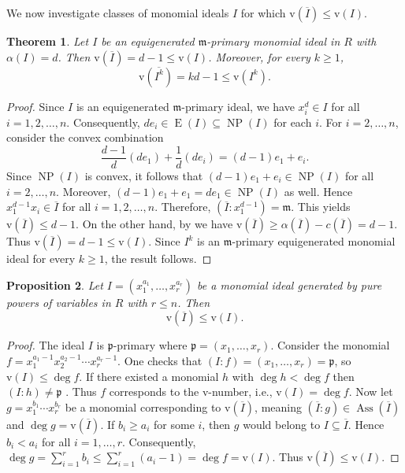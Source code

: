 \documentclass[11pt,reqno,a4paper]{amsart}
\newtheorem{theorem}{Theorem}[section]
\newtheorem{proposition}[theorem]{Proposition}
\theoremstyle{definition}
\begin{document}
\noindent We now investigate classes of monomial ideals \(I\) for which
\(
\mathrm{v}(\overline{I})\leq \mathrm{v}(I).
\)


\begin{theorem}\label{equigeneratedmprimary}
Let $I$ be an equigenerated $\mathfrak  {m}$-primary monomial ideal in \(R\) with $\alpha(I) = d$. Then $\mathrm{v}(\overline{I}) = d - 1 \leq \mathrm{v}({I})$. Moreover, for every \(k \ge 1\),
\[
\mathrm{v}(\overline{I^k}) = kd - 1 \le \mathrm{v}(I^k).
\]
\end{theorem}

\begin{proof}
Since $I$ is an equigenerated $\mathfrak{m}$-primary ideal, we have $x_i^d \in I$ for all $i = 1, 2, \ldots, n$. Consequently, $d e_i \in \operatorname{E}(I) \subseteq \operatorname{NP}(I)$ for each $i$. 
For $i = 2, \ldots, n$, consider the convex combination
\[
\frac{d-1}{d}(d e_1) + \frac{1}{d}(d e_i) = (d-1)e_1 + e_i.
\]
Since $\operatorname{NP}(I)$ is convex, it follows that $(d-1)e_1 + e_i \in \operatorname{NP}(I)$ for all $i = 2, \ldots, n$. Moreover, $(d-1)e_1 + e_1 = d e_1 \in \operatorname{NP}(I)$ as well. Hence $x_1^{d-1} x_i \in \overline{I}$ for all $i = 1, 2, \ldots, n$.
Therefore, $(\overline{I} : x_1^{d-1}) = \mathfrak{m}$. This yields $\mathrm{v}(\overline{I}) \le d - 1$. On the other hand, by \cite[Lemma 3.1]{BiswasMandalSaha26} we have $\mathrm{v}(\overline{I}) \ge \alpha(\overline{I}) - c(\overline{I}) = d - 1$. Thus $\mathrm{v}(\overline{I}) = d - 1 \leq \mathrm{v}({I})$. Since \(I^k\) is an \(\mathfrak{m}\)-primary equigenerated monomial ideal for every \(k \ge 1\), the result follows.
\end{proof}


\begin{proposition}
Let \(I = (x_1^{a_1}, \dots, x_r^{a_r})\) be a monomial ideal generated by pure powers of variables in \(R \) with \(r \le n\). Then 
\[
\mathrm{v}(\overline{I}) \le \mathrm{v}(I).
\]
\end{proposition}

\begin{proof}
The ideal \(I\) is \(\mathfrak{p}\)-primary where \(\mathfrak{p} = (x_1, \dots, x_r)\). Consider the monomial 
\(f = x_1^{a_1 - 1} x_2^{a_2 - 1} \cdots x_r^{a_r - 1}\). 
One checks that \((I : f) = (x_1, \dots, x_r) = \mathfrak{p}\), so \(\mathrm{v}(I) \le \deg f\). 
If there existed a monomial \(h\) with \(\deg h < \deg f\) then \((I : h) \neq \mathfrak{p}\) . Thus \(f\) corresponds to the \(\mathrm{v}\)-number, i.e., \(\mathrm{v}(I) = \deg f\). Now let \(g = x_1^{b_1} \cdots x_r^{b_r}\) be a monomial corresponding to \(\mathrm{v}(\overline{I})\), meaning \((\overline{I} : g) \in \operatorname{Ass}(\overline{I})\) and \(\deg g = \mathrm{v}(\overline{I})\). 
If \(b_i \ge a_i\) for some \(i\), then \(g\) would belong to \(I \subseteq \overline{I}\). Hence \(b_i < a_i\) for all \(i = 1, \dots, r\). Consequently,
\(
\deg g = \sum_{i=1}^r b_i \le \sum_{i=1}^r (a_i - 1) = \deg f = \mathrm{v}(I).
\)
Thus \(\mathrm{v}(\overline{I}) \le \mathrm{v}(I)\).
\end{proof}
\end{document}
